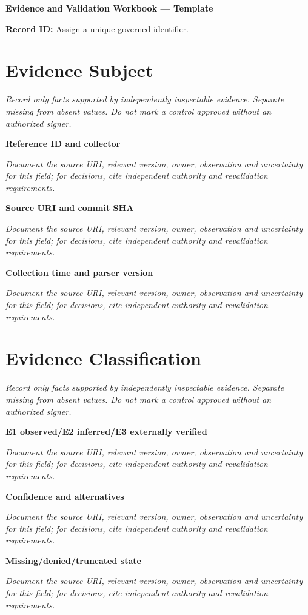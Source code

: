 \documentclass[11pt,letterpaper]{article}
\begin{document}
\begin{center}{\LARGE\bfseries Evidence and Validation Workbook --- Template}\par
\vspace{4pt}{\small Guided authoring instrument (not a completed assessment)}\par
\end{center}
\noindent\textbf{Record ID:} Assign a unique governed identifier.\par
\section{Evidence Subject}
\noindent\emph{Record only facts supported by independently inspectable evidence. Separate missing from absent values. Do not mark a control approved without an authorized signer.}\par
\noindent\textbf{Reference ID and collector}\par
\noindent\emph{Document the source URI, relevant version, owner, observation and uncertainty for this field; for decisions, cite independent authority and revalidation requirements.}\par\medskip
\noindent\textbf{Source URI and commit SHA}\par
\noindent\emph{Document the source URI, relevant version, owner, observation and uncertainty for this field; for decisions, cite independent authority and revalidation requirements.}\par\medskip
\noindent\textbf{Collection time and parser version}\par
\noindent\emph{Document the source URI, relevant version, owner, observation and uncertainty for this field; for decisions, cite independent authority and revalidation requirements.}\par\medskip
\section{Evidence Classification}
\noindent\emph{Record only facts supported by independently inspectable evidence. Separate missing from absent values. Do not mark a control approved without an authorized signer.}\par
\noindent\textbf{E1 observed/E2 inferred/E3 externally verified}\par
\noindent\emph{Document the source URI, relevant version, owner, observation and uncertainty for this field; for decisions, cite independent authority and revalidation requirements.}\par\medskip
\noindent\textbf{Confidence and alternatives}\par
\noindent\emph{Document the source URI, relevant version, owner, observation and uncertainty for this field; for decisions, cite independent authority and revalidation requirements.}\par\medskip
\noindent\textbf{Missing/denied/truncated state}\par
\noindent\emph{Document the source URI, relevant version, owner, observation and uncertainty for this field; for decisions, cite independent authority and revalidation requirements.}\par\medskip
\end{document}

